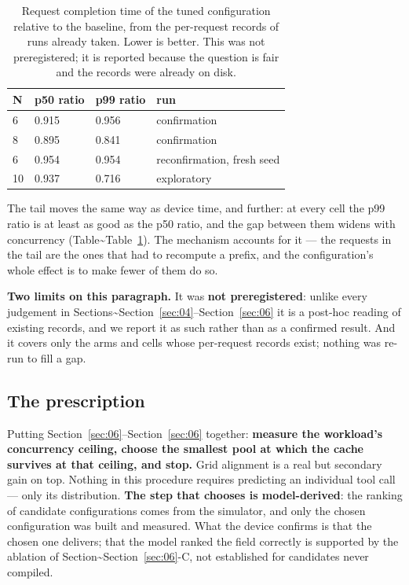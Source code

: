 \begin{table}[t]
  \centering
  \caption{Request completion time of the tuned configuration relative to the baseline, from the per-request records of runs already taken. Lower is better. This was not preregistered; it is reported because the question is fair and the records were already on disk.}
  \label{tab:tail}
  \footnotesize
  \begin{tabular}{p{1.1cm}p{1.9cm}p{1.9cm}p{2.5cm}}
    \toprule
    N & p50 ratio & p99 ratio & run \\
    \midrule
    6 & 0.915 & 0.956 & confirmation \\
    8 & 0.895 & 0.841 & confirmation \\
    6 & 0.954 & 0.954 & reconfirmation, fresh seed \\
    10 & 0.937 & 0.716 & exploratory \\
    \bottomrule
  \end{tabular}
\end{table}

The tail moves the same way as device time, and further: at every cell the p99 ratio is at least as good as the p50 ratio, and the gap between them widens with concurrency (Table\textasciitilde{}Table~\ref{tab:tail}). The mechanism accounts for it --- the requests in the tail are the ones that had to recompute a prefix, and the configuration's whole effect is to make fewer of them do so.

\textbf{Two limits on this paragraph.} It was \textbf{not preregistered}: unlike every judgement in Sections\textasciitilde{}Section~\ref{sec:04}--Section~\ref{sec:06} it is a post-hoc reading of existing records, and we report it as such rather than as a confirmed result. And it covers only the arms and cells whose per-request records exist; nothing was re-run to fill a gap.

\subsection{The prescription}

Putting Section~\ref{sec:06}--Section~\ref{sec:06} together: \textbf{measure the workload's concurrency ceiling, choose the smallest pool at which the cache survives at that ceiling, and stop.} Grid alignment is a real but secondary gain on top. Nothing in this procedure requires predicting an individual tool call --- only its distribution. \textbf{The step that chooses is model-derived}: the ranking of candidate configurations comes from the simulator, and only the chosen configuration was built and measured. What the device confirms is that the chosen one delivers; that the model ranked the field correctly is supported by the ablation of Section\textasciitilde{}Section~\ref{sec:06}-C, not established for candidates never compiled.
